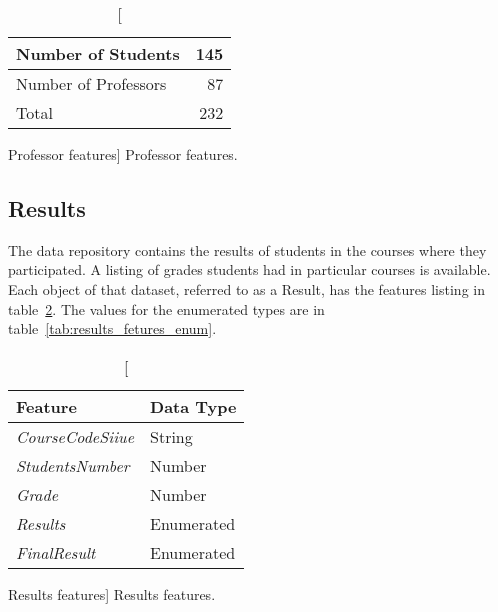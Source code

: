 \begin{table}[h!]
    \centering

    \begin{tabular}{| l | r |}
        \hline
        Number of Students   & 145 \\ \hline
        Number of Professors & 87  \\ \hline
        Total                & 232 \\ \hline
    \end{tabular}

    \caption
        [Professor features]
        {Professor features.}

    \label{tab:moodle_users_stats}
\end{table}

\subsection{Results}

The data repository contains the results of students in the courses where they
participated. A listing of grades students had in particular courses is
available. Each object of that dataset, referred to as a Result, has the
features listing in table~\ref{tab:results_fetures}. The values for the
enumerated types are in table~\ref{tab:results_fetures_enum}.

\begin{table}[h!]
    \centering

    \begin{tabular}{l l}
        Feature                  & Data Type  \\ \hline
        \textit{CourseCodeSiiue} & String     \\
        \textit{StudentsNumber}  & Number     \\
        \textit{Grade}           & Number     \\
        \textit{Results}         & Enumerated \\
        \textit{FinalResult}     & Enumerated \\
    \end{tabular}

    \caption
        [Results features]
        {Results features.}

    \label{tab:results_fetures}
\end{table}

